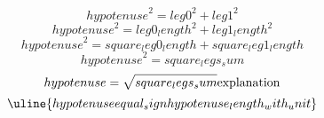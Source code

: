\[ {hypotenuse}^{2}={leg0}^{2}+{leg1}^{2} \]
\[ {hypotenuse}^{2}={leg0_length}^{2}+{leg1_length}^{2} \]
\[ {hypotenuse}^{2}={square_leg0_length}+{square_leg1_length} \]
\[ {hypotenuse}^{2}={square_legs_sum}\]
\[ {hypotenuse}=\sqrt{\mathstrut {square_legs_sum}}\text{{explanation}}\]
\[ \uline{{hypotenuse}{equal_sign}{hypotenuse_length_with_unit}}\]